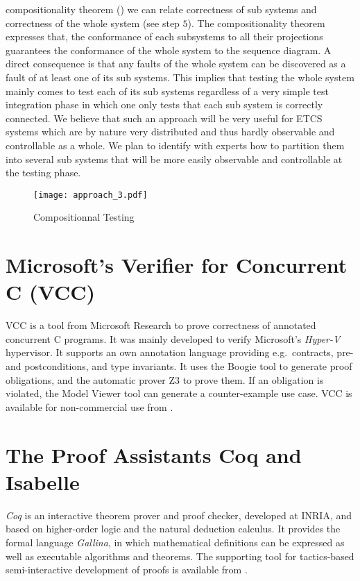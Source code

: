 compositionality theorem (\cite{bannour2012}) we can relate
correctness of sub systems and correctness of the whole system (see
step $5$).  The compositionality theorem expresses that, the
conformance of each subsystems to all their projections guarantees the
conformance of the whole system to the sequence diagram. A direct
consequence is that any faults of the whole system can be discovered
as a fault of at least one of its sub systems. This implies that
testing the whole system mainly comes to test each of its sub systems
regardless of a very simple test integration phase in which one only
tests that each sub system is correctly connected. We believe that
such an approach will be very useful for ETCS systems which are by
nature very distributed and thus hardly observable and controllable as
a whole. We plan to identify with experts how to partition them into
several sub systems that will be more easily observable and
controllable at the testing phase.


\begin{figure}
\centering
\texttt{[image: approach\_3.pdf]}
\caption{\label{ct}Compositionnal Testing}
\end{figure}








\section{Microsoft's Verifier for Concurrent C (VCC)}

VCC is a tool from Microsoft Research
to prove correctness of annotated concurrent C programs.
It was mainly developed to verify Microsoft's \emph{Hyper-V} hypervisor.
%
It supports an own annotation language providing
e.g.\ contracts, pre- and postconditions, and type invariants.
%
It uses the Boogie tool to generate proof obligations,
and the automatic prover Z3 to prove them.
%
If an obligation is violated, the Model Viewer tool can generate a
counter-example use case.
%
VCC is available for non-commercial use from \cite{vcc}.


\section{The Proof Assistants Coq and Isabelle}


{\em Coq} is an interactive theorem prover and proof checker,
developed at INRIA, and based on
higher-order logic and the natural deduction calculus.
%
It provides the formal language {\em Gallina}, in which
mathematical definitions can be expressed as well as
executable algorithms and theorems.
%
The supporting tool for tactics-based semi-interactive development of
proofs is available from \cite{coq}.
%

